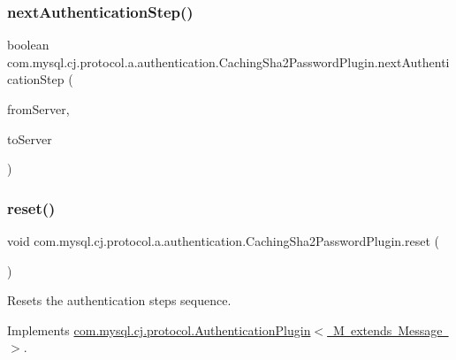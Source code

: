 \subsubsection{\texorpdfstring{next\+Authentication\+Step()}{nextAuthenticationStep()}}
{\footnotesize\ttfamily boolean com.\+mysql.\+cj.\+protocol.\+a.\+authentication.\+Caching\+Sha2\+Password\+Plugin.\+next\+Authentication\+Step (\begin{DoxyParamCaption}\item[{\mbox{\hyperlink{classcom_1_1mysql_1_1cj_1_1protocol_1_1a_1_1_native_packet_payload}{Native\+Packet\+Payload}}}]{from\+Server,  }\item[{List$<$ \mbox{\hyperlink{classcom_1_1mysql_1_1cj_1_1protocol_1_1a_1_1_native_packet_payload}{Native\+Packet\+Payload}} $>$}]{to\+Server }\end{DoxyParamCaption})}

\mbox{\label{classcom_1_1mysql_1_1cj_1_1protocol_1_1a_1_1authentication_1_1_caching_sha2_password_plugin_a7f042851c3087a8bdf431023ed01b29c}} 
\subsubsection{\texorpdfstring{reset()}{reset()}}
{\footnotesize\ttfamily void com.\+mysql.\+cj.\+protocol.\+a.\+authentication.\+Caching\+Sha2\+Password\+Plugin.\+reset (\begin{DoxyParamCaption}{ }\end{DoxyParamCaption})}

Resets the authentication steps sequence. 

Implements \mbox{\hyperlink{interfacecom_1_1mysql_1_1cj_1_1protocol_1_1_authentication_plugin_a504193fb759e76fedc7ca7b00effb44d}{com.\+mysql.\+cj.\+protocol.\+Authentication\+Plugin$<$ M extends Message $>$}}.



